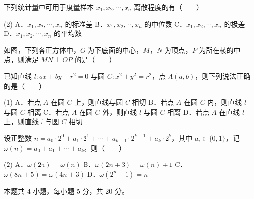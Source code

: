 \begin{question}
下列统计量中可用于度量样本 $x_1,x_2,\cdots,x_n$ 离散程度的有（　　）

\begin{gkopts}(2)
\task A．$x_1,x_2,\cdots,x_n$ 的标准差
\task B．$x_1,x_2,\cdots,x_n$ 的中位数
\task C．$x_1,x_2,\cdots,x_n$ 的极差
\task D．$x_1,x_2,\cdots,x_n$ 的平均数
\end{gkopts}

\Needspace{0.4\textheight}
\end{question}
\begin{question}
如图，下列各正方体中，$O$ 为下底面的中心，$M$，$N$ 为顶点，$P$ 为所在棱的中点，则满足 $MN\perp OP$ 的是（　　）
\nopagebreak[4]
\begin{center}\end{center}
\nopagebreak[4]
\end{question}
\begin{question}
已知直线 $l:ax+by-r^{2}=0$ 与圆 $C:x^{2}+y^{2}=r^{2}$，点 $A(a,b)$，则下列说法正确的是（　　）

\begin{gkopts}(1)
\task A．若点 $A$ 在圆 $C$ 上，则直线与圆 $C$ 相切
\task B．若点 $A$ 在圆 $C$ 内，则直线 $l$ 与圆 $C$ 相离
\task C．若点 $A$ 在圆 $C$ 外，则直线 $l$ 与圆 $C$ 相离
\task D．若点 $A$ 在直线 $l$ 上，则直线 $l$ 与圆 $C$ 相切
\end{gkopts}

\end{question}
\begin{question}
设正整数 $n=a_0\cdot2^{0}+a_1\cdot2^{1}+\cdots+a_{k-1}\cdot2^{k-1}+a_k\cdot2^{k}$，其中 $a_i\in\{0,1\}$，记 $\omega(n)=a_0+a_1+\cdots+a_k$。则（　　）

\begin{gkopts}(2)
\task A．$\omega(2n)=\omega(n)$
\task B．$\omega(2n+3)=\omega(n)+1$
\task C．$\omega(8n+5)=\omega(4n+3)$
\task D．$\omega\left(2^{n}-1\right)=n$
\end{gkopts}

\par\medskip

\end{question}

\begin{gktip}
本题共 4 小题，每小题 5 分，共 20 分。
\end{gktip}

